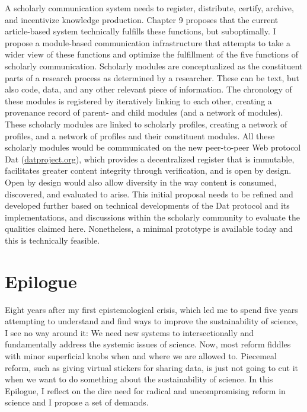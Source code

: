 \documentclass[a5paper]{book}
\begin{document}
A scholarly communication system needs to register, distribute, certify,
archive, and incentivize knowledge production. Chapter 9 proposes that
the current article-based system technically fulfills these functions,
but suboptimally. I propose a module-based communication infrastructure
that attempts to take a wider view of these functions and optimize the
fulfillment of the five functions of scholarly communication. Scholarly
modules are conceptualized as the constituent parts of a research
process as determined by a researcher. These can be text, but also code,
data, and any other relevant piece of information. The chronology of
these modules is registered by iteratively linking to each other,
creating a provenance record of parent- and child modules (and a network
of modules). These scholarly modules are linked to scholarly profiles,
creating a network of profiles, and a network of profiles and their
constituent modules. All these scholarly modules would be communicated
on the new peer-to-peer Web protocol Dat
(\href{https://datproject.org}{datproject.org}), which provides a
decentralized register that is immutable, facilitates greater content
integrity through verification, and is open by design. Open by design
would also allow diversity in the way content is consumed, discovered,
and evaluated to arise. This initial proposal needs to be refined and
developed further based on technical developments of the Dat protocol
and its implementations, and discussions within the scholarly community
to evaluate the qualities claimed here. Nonetheless, a minimal prototype
is available today and this is technically feasible.

\chapter*{Epilogue}\label{epilogue}

Eight years after my first epistemological crisis, which led me to spend
five years attempting to understand and find ways to improve the
sustainability of science, I see no way around it: We need new systems
to intersectionally and fundamentally address the systemic issues of
science. Now, most reform fiddles with minor superficial knobs when and
where we are allowed to. Piecemeal reform, such as giving virtual
stickers for sharing data, is just not going to cut it when we want to
do something about the sustainability of science. In this Epilogue, I
reflect on the dire need for radical and uncompromising reform in
science and I propose a set of demands.
\end{document}

